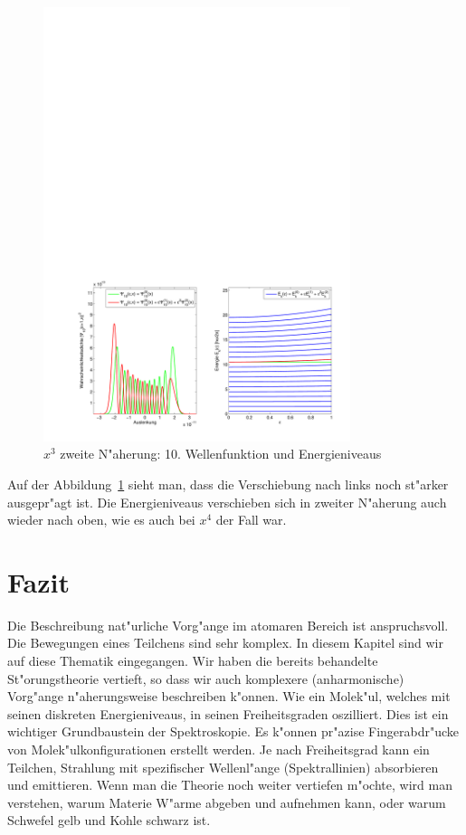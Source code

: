 \begin{refsection}
\begin{figure}	%
\centering
\includegraphics[width=0.8\textwidth]{anharmonisch/images/x3/Stoerung2Wellenfunktion.pdf}
\caption{$x^3$ zweite N"aherung: 10. Wellenfunktion und Energieniveaus
\label{skript:x3_Stoerung2Wellenfunktion}}
\end{figure}

Auf der Abbildung~\ref{skript:x3_Stoerung2Wellenfunktion} sieht man,
dass die Verschiebung nach links noch st"arker ausgepr"agt ist.
Die Energieniveaus verschieben sich in zweiter N"aherung auch wieder nach oben,
wie es auch bei $x^4$ der Fall war.

\section{Fazit}

Die Beschreibung nat"urliche Vorg"ange im atomaren Bereich ist anspruchsvoll.
Die Bewegungen eines Teilchens sind sehr komplex.
In diesem Kapitel sind wir auf diese Thematik eingegangen.
Wir haben die bereits behandelte St"orungstheorie vertieft,
so dass wir auch komplexere (anharmonische) Vorg"ange n"aherungsweise
beschreiben k"onnen.
Wie ein Molek"ul, welches mit seinen diskreten Energieniveaus,
in seinen Freiheitsgraden oszilliert.
Dies ist ein wichtiger Grundbaustein der Spektroskopie.
Es k"onnen pr"azise Fingerabdr"ucke von Molek"ulkonfigurationen erstellt werden.
Je nach Freiheitsgrad kann ein Teilchen, Strahlung mit spezifischer Wellenl"ange
(Spektrallinien)  absorbieren und  emittieren.
Wenn man die Theorie noch weiter vertiefen m"ochte, wird man verstehen,
warum Materie W"arme abgeben und aufnehmen kann,
oder warum Schwefel gelb und Kohle schwarz ist.

\printbibliography[heading=subbibliography]
\end{refsection}


